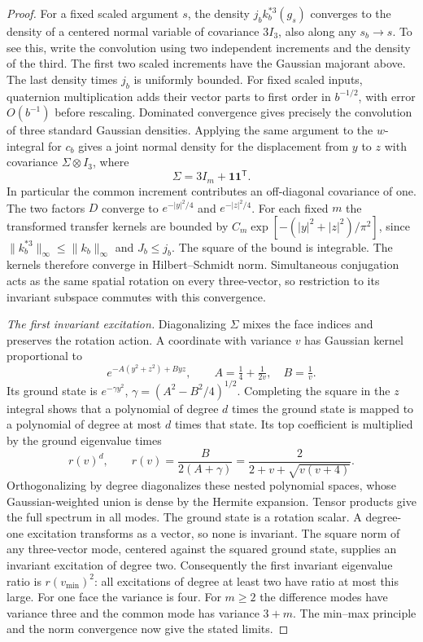 \begin{proof}
For a fixed scaled argument \(s\), the density
\(j_b k_b^{*3}(g_s)\) converges to the density of a centered normal
variable of covariance \(3I_3\), also along any \(s_b\to s\).
To see this, write the convolution using two independent increments and the
density of the third. The first two scaled increments have the Gaussian
majorant above. The last density times \(j_b\) is uniformly bounded.
For fixed scaled inputs, quaternion multiplication adds their vector parts
to first order in \(b^{-1/2}\), with error \(O(b^{-1})\) before rescaling.
Dominated convergence gives precisely the convolution of three standard
Gaussian densities. Applying the same argument to the \(w\)-integral for
\(c_b\) gives a joint normal density for the displacement from \(y\) to \(z\)
with covariance \(\Sigma\otimes I_3\), where
\[
 \Sigma=3I_m+\mathbf 1\mathbf 1^{\mathsf T}.
\]
In particular the common increment contributes an off-diagonal covariance
of one. The two factors \(D\) converge to \(e^{-|y|^2/4}\) and
\(e^{-|z|^2/4}\). For each fixed \(m\) the transformed transfer kernels are
bounded by \(C_m\exp[-(|y|^2+|z|^2)/\pi^2]\), since
\(\|k_b^{*3}\|_\infty\le\|k_b\|_\infty\) and \(J_b\le j_b\).
The square of the bound is integrable. The kernels therefore converge in
Hilbert--Schmidt norm. Simultaneous conjugation acts as the same spatial
rotation on every three-vector, so restriction to its invariant subspace
commutes with this convergence.

\smallskip\noindent\emph{The first invariant excitation.}
Diagonalizing \(\Sigma\) mixes the face indices and preserves the rotation
action. A coordinate with variance \(v\) has Gaussian kernel proportional to
\[
 e^{-A(y^2+z^2)+B yz},\qquad A=\tfrac14+\tfrac1{2v},\quad B=\tfrac1v.
\]
Its ground state is \(e^{-\gamma y^2}\),
\(\gamma=(A^2-B^2/4)^{1/2}\). Completing the square in the \(z\) integral
shows that a polynomial of degree \(d\) times the ground state is mapped
to a polynomial of degree at most \(d\) times that state. Its top coefficient
is multiplied by the ground eigenvalue times
\[
 r(v)^d,\qquad
 r(v)=\frac{B}{2(A+\gamma)}
     =\frac{2}{2+v+\sqrt{v(v+4)}} .
\]
Orthogonalizing by degree diagonalizes these nested polynomial spaces,
whose Gaussian-weighted union is dense by the Hermite expansion.
Tensor products give the full spectrum in all modes. The ground state is a
rotation scalar. A degree-one excitation transforms as a vector, so none is
invariant. The square norm of any three-vector mode, centered against the
squared ground state, supplies an invariant excitation of degree two.
Consequently the first invariant eigenvalue ratio is \(r(v_{\min})^2\):
all excitations of degree at least two have ratio at most this large.
For one face the variance is four. For \(m\ge2\) the difference modes
have variance three and the common mode has variance \(3+m\).
The min--max principle and the norm convergence now give the stated limits.


\end{proof}
